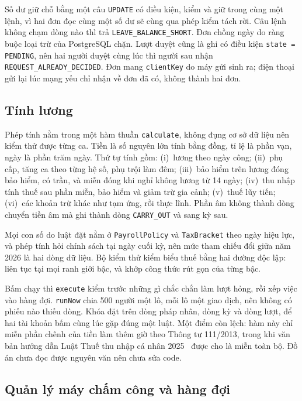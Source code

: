 \documentclass[../DoAn.tex]{subfiles}
\begin{document}
Số dư giữ chỗ bằng một câu \texttt{UPDATE} có điều kiện, kiểm và giữ trong cùng một lệnh, vì hai đơn đọc cùng một số
dư sẽ cùng qua phép kiểm tách rời. Câu lệnh không chạm dòng nào thì trả \texttt{LEAVE\_BALANCE\_SHORT}. Đơn chồng ngày
do ràng buộc loại trừ của PostgreSQL chặn. Lượt duyệt cũng là ghi có điều kiện \texttt{state = PENDING}, nên hai người
duyệt cùng lúc thì người sau nhận \texttt{REQUEST\_ALREADY\_DECIDED}. Đơn mang \texttt{clientKey} do máy gửi sinh ra; điện thoại gửi lại lúc mạng yếu chỉ nhận về đơn đã có, không thành hai đơn.

\subsection{Tính lương}
\label{section:4.5.5}

Phép tính nằm trong một hàm thuần \texttt{calculate}, không đụng cơ sở dữ liệu nên kiểm thử được từng ca. Tiền là số
nguyên lớn tính bằng đồng, tỉ lệ là phần vạn, ngày là phần trăm ngày. Thứ tự tính gồm: (i)~lương theo ngày công;
(ii)~phụ cấp, tăng ca theo từng hệ số, phụ trội làm đêm; (iii)~bảo hiểm trên lương đóng bảo hiểm, có trần, và miễn
đóng khi nghỉ không lương từ 14 ngày; (iv)~thu nhập tính thuế sau phần miễn, bảo hiểm và giảm trừ gia cảnh; (v)~thuế
lũy tiến; (vi)~các khoản trừ khác như tạm ứng, rồi thực lĩnh. Phần âm không thành dòng chuyển tiền âm mà ghi thành
dòng \texttt{CARRY\_OUT} và sang kỳ sau.

Mọi con số do luật đặt nằm ở \texttt{PayrollPolicy} và \texttt{TaxBracket} theo ngày hiệu lực, và phép tính hỏi chính
sách tại ngày cuối kỳ, nên mức tham chiếu đổi giữa năm 2026 là hai dòng dữ liệu. Bộ kiểm thử kiểm biểu thuế bằng hai
đường độc lập: liên tục tại mọi ranh giới bậc, và khớp công thức rút gọn của từng bậc.

Bấm chạy thì \texttt{execute} kiểm trước những gì chắc chắn làm lượt hỏng, rồi xếp việc vào hàng đợi. \texttt{runNow}
chia 500 người một lô, mỗi lô một giao dịch, nên không có phiếu nào thiếu dòng. Khóa đặt trên dòng pháp nhân, dòng kỳ và dòng lượt, để hai tài khoản bấm cùng lúc gặp đúng một luật. Một điểm còn lệch: hàm này chỉ miễn phần chênh của tiền
làm thêm giờ theo Thông tư 111/2013, trong khi văn bản hướng dẫn Luật Thuế thu nhập cá nhân
2025~\cite{luattncn2025} được cho là miễn toàn bộ. Đồ án chưa đọc được nguyên văn nên chưa sửa code.

\subsection{Quản lý máy chấm công và hàng đợi}
\label{section:4.5.6}
\end{document}
